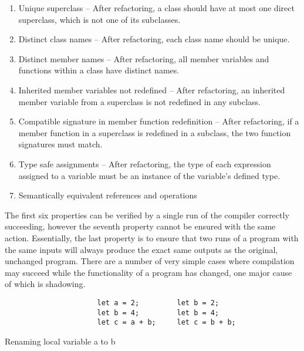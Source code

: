 \begin{enumerate}
\item Unique superclass -- After refactoring, a class should have at most one direct superclass, which is not one of its subclasses.
\item Distinct class names -- After refactoring, each class name should be unique.
\item Distinct member names --  After refactoring, all member variables and functions within a class have distinct names.
\item Inherited member variables not redefined -- After refactoring, an inherited member variable from a superclass is not redefined in any subclass.
\item Compatible signature in member function redefinition -- After refactoring, if a member function in a superclass is redefined in a subclass, the two function signatures must match.
\item Type safe assignments -- After refactoring, the type of each expression assigned to a variable must be an instance of the variable's defined type.
\item Semantically equivalent references and operations
\end{enumerate}

The first six properties can be verified by a single run of the compiler correctly succeeding, however the seventh property cannot be ensured with the same action. Essentially, the last property is to ensure that two runs of a program with the same inputs will always produce the exact same outputs as the original, unchanged program. There are a number of very simple cases where compilation may succeed while the functionality of a program has changed, one major cause of which is shadowing. 

\begin{fig}
\begin{verbatim}
                      let a = 2;         let b = 2;
                      let b = 4;         let b = 4;
                      let c = a + b;     let c = b + b;
\end{verbatim}
\caption{Renaming local variable a to b}
\label{Fig:opdyke}
\end{fig}

